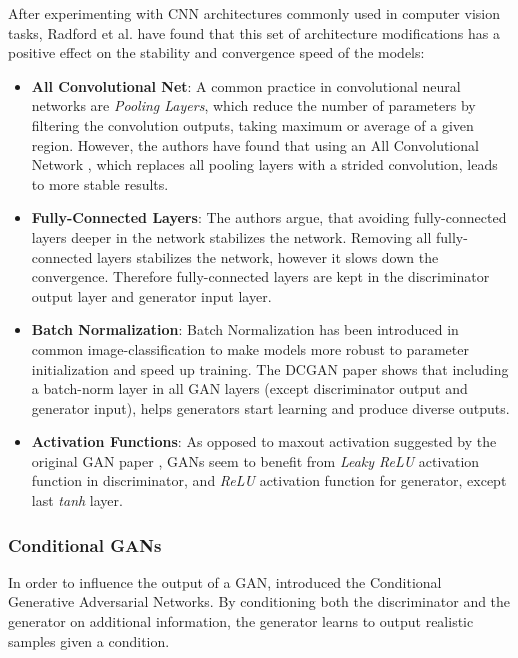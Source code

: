 \documentclass{article}
\begin{document}
After experimenting with CNN architectures commonly used in computer vision tasks, Radford et al. have found that this set of architecture modifications has a positive effect on the stability and convergence speed of the models:
\begin{itemize}
\item \textbf{All Convolutional Net}: A common practice in convolutional neural networks are \textit{Pooling Layers}, which reduce the number of parameters by filtering the convolution outputs, taking maximum or average of a given region. However, the authors have found that using an All Convolutional Network \cite{springenberg_striving_2014}, which replaces all pooling layers with a strided convolution, leads to more stable results.
\item \textbf{Fully-Connected Layers}: The authors argue, that avoiding fully-connected layers deeper in the network stabilizes the network. Removing all fully-connected layers stabilizes the network, however it slows down the convergence. Therefore fully-connected layers are kept in the discriminator output layer and generator input layer. 
\item \textbf{Batch Normalization}: Batch Normalization \cite{ioffe_batch_2015} has been introduced in common image-classification to make models more robust to parameter initialization and speed up training. The DCGAN paper shows that including a batch-norm layer in all GAN layers (except discriminator output and generator input), helps generators start learning and produce diverse outputs.
\item \textbf{Activation Functions}: As opposed to maxout activation suggested by the original GAN paper \cite{goodfellow_generative_2014}, GANs seem to benefit from \textit{Leaky ReLU} activation function in discriminator, and \textit{ReLU} activation function for generator, except last \textit{tanh} layer. 
\end{itemize}



\subsubsection{Conditional GANs} \label{sec:cond_gan}
In order to influence the output of a GAN, \cite{mirza_conditional_2014} introduced the Conditional Generative Adversarial Networks. By conditioning both the discriminator and the generator on additional information, the generator learns to output realistic samples given a condition. 
\end{document}
